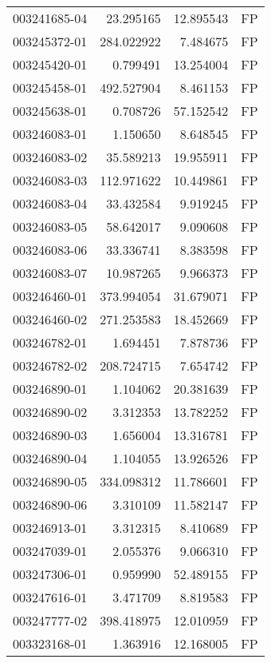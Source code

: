 \begin{tabular}{lrrl}
003241685-04 &   23.295165 &      12.895543 &   FP \\
003245372-01 &  284.022922 &       7.484675 &   FP \\
003245420-01 &    0.799491 &      13.254004 &   FP \\
003245458-01 &  492.527904 &       8.461153 &   FP \\
003245638-01 &    0.708726 &      57.152542 &   FP \\
003246083-01 &    1.150650 &       8.648545 &   FP \\
003246083-02 &   35.589213 &      19.955911 &   FP \\
003246083-03 &  112.971622 &      10.449861 &   FP \\
003246083-04 &   33.432584 &       9.919245 &   FP \\
003246083-05 &   58.642017 &       9.090608 &   FP \\
003246083-06 &   33.336741 &       8.383598 &   FP \\
003246083-07 &   10.987265 &       9.966373 &   FP \\
003246460-01 &  373.994054 &      31.679071 &   FP \\
003246460-02 &  271.253583 &      18.452669 &   FP \\
003246782-01 &    1.694451 &       7.878736 &   FP \\
003246782-02 &  208.724715 &       7.654742 &   FP \\
003246890-01 &    1.104062 &      20.381639 &   FP \\
003246890-02 &    3.312353 &      13.782252 &   FP \\
003246890-03 &    1.656004 &      13.316781 &   FP \\
003246890-04 &    1.104055 &      13.926526 &   FP \\
003246890-05 &  334.098312 &      11.786601 &   FP \\
003246890-06 &    3.310109 &      11.582147 &   FP \\
003246913-01 &    3.312315 &       8.410689 &   FP \\
003247039-01 &    2.055376 &       9.066310 &   FP \\
003247306-01 &    0.959990 &      52.489155 &   FP \\
003247616-01 &    3.471709 &       8.819583 &   FP \\
003247777-02 &  398.418975 &      12.010959 &   FP \\
003323168-01 &    1.363916 &      12.168005 &   FP \\

\end{tabular}
